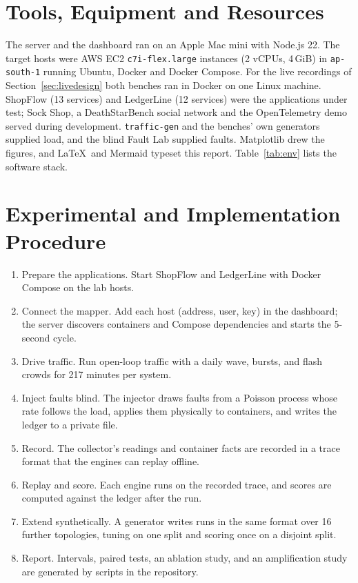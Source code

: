 \section{Tools, Equipment and Resources}
The server and the dashboard ran on an Apple Mac mini with Node.js 22. The target hosts were AWS EC2 \texttt{c7i-flex.large} instances (2 vCPUs, 4\,GiB) in \texttt{ap-south-1} running Ubuntu, Docker and Docker Compose. For the live recordings of Section~\ref{sec:livedesign} both benches ran in Docker on one Linux machine. ShopFlow (13 services) and LedgerLine (12 services) were the applications under test; Sock Shop, a DeathStarBench social network and the OpenTelemetry demo served during development. \texttt{traffic-gen} and the benches' own generators supplied load, and the blind Fault Lab supplied faults. Matplotlib drew the figures, and \LaTeX\ and Mermaid typeset this report. Table~\ref{tab:env} lists the software stack.

\section{Experimental and Implementation Procedure}
\begin{enumerate}
\item Prepare the applications. Start ShopFlow and LedgerLine with Docker Compose on the lab hosts.
\item Connect the mapper. Add each host (address, user, key) in the dashboard; the server discovers containers and Compose dependencies and starts the 5-second cycle.
\item Drive traffic. Run open-loop traffic with a daily wave, bursts, and flash crowds for 217 minutes per system.
\item Inject faults blind. The injector draws faults from a Poisson process whose rate follows the load, applies them physically to containers, and writes the ledger to a private file.
\item Record. The collector's readings and container facts are recorded in a trace format that the engines can replay offline.
\item Replay and score. Each engine runs on the recorded trace, and scores are computed against the ledger after the run.
\item Extend synthetically. A generator writes runs in the same format over 16 further topologies, tuning on one split and scoring once on a disjoint split.
\item Report. Intervals, paired tests, an ablation study, and an amplification study are generated by scripts in the repository.
\end{enumerate}

